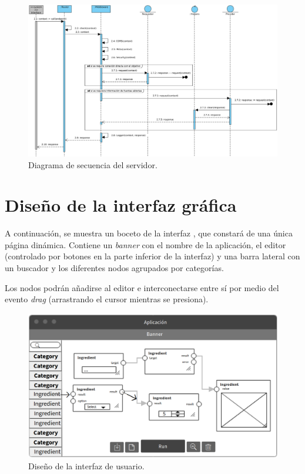 \begin{figure}[H]
    \centering
    \includegraphics[width=15cm]{img/tables/24_Sequence-Diagram-Server.png}
    \caption{Diagrama de secuencia del servidor.}
    \label{fig:seqdiagramserver}
\end{figure}


\section{Diseño de la interfaz gráfica} \label{sec:graphicinterface}

A continuación, se muestra un boceto de la interfaz , que constará de una única página dinámica. Contiene un \textit{banner} con el nombre de la aplicación, el editor (controlado por botones en la parte inferior de la interfaz) y una barra lateral con un buscador y los diferentes nodos agrupados por categorías.\sn

Los nodos podrán añadirse al editor e interconectarse entre sí por medio del evento \textit{drag} (arrastrando el cursor mientras se presiona).\sn

\begin{figure}[H]
    \centering
    \includegraphics[width=12cm]{img/tables/25_User-Iterface.png}
    \caption{Diseño de la interfaz de usuario.}
    \label{fig:userinterface}
\end{figure}